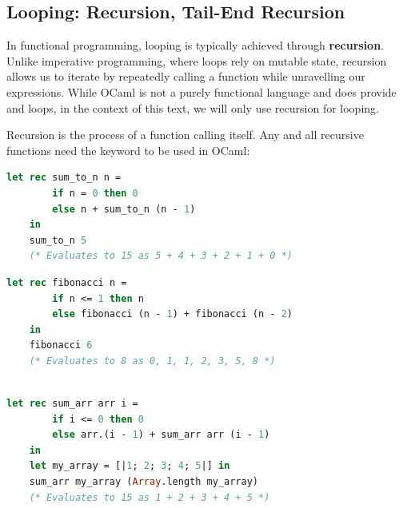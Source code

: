 \newpage 
    
\subsection{Looping: Recursion, Tail-End Recursion}

In functional programming, looping is typically achieved through \textbf{recursion}. Unlike imperative programming, where loops rely on mutable state, 
recursion allows us to iterate by repeatedly calling a function while unravelling our expressions. While OCaml is not a purely functional language and does provide  and  loops, 
in the context of this text, we will only use recursion for looping.

\vspace{2em}
\begin{Def}

Recursion is the process of a function calling itself. Any and all recursive functions need the keyword
 to be used in OCaml:

\noindent

\begin{lstlisting}[language=OCaml, caption={Summing to $n$ Using Recursion}, numbers=none]
    let rec sum_to_n n =
        if n = 0 then 0
        else n + sum_to_n (n - 1)
    in 
    sum_to_n 5
    (* Evaluates to 15 as 5 + 4 + 3 + 2 + 1 + 0 *)
\end{lstlisting}

\begin{lstlisting}[language=OCaml, caption={Fibonacci Sequence Using Recursion}, numbers=none]
    let rec fibonacci n =
        if n <= 1 then n
        else fibonacci (n - 1) + fibonacci (n - 2)
    in 
    fibonacci 6
    (* Evaluates to 8 as 0, 1, 1, 2, 3, 5, 8 *)
    
\end{lstlisting}

\begin{lstlisting}[language=OCaml, caption={Sum an Array of Integers Using Recursion}, numbers=none]
    let rec sum_arr arr i =
        if i <= 0 then 0
        else arr.(i - 1) + sum_arr arr (i - 1)
    in
    let my_array = [|1; 2; 3; 4; 5|] in
    sum_arr my_array (Array.length my_array)
    (* Evaluates to 15 as 1 + 2 + 3 + 4 + 5 *)
\end{lstlisting}

\end{Def}

\newpage

